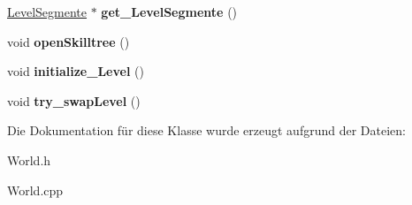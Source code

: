 \begin{DoxyCompactItemize}
\item 
\hypertarget{class_world_affdfa76f27683180d8103b297ae6972c}{\hyperlink{class_level_segmente}{Level\-Segmente} $\ast$ {\bfseries get\-\_\-\-Level\-Segmente} ()}\label{class_world_affdfa76f27683180d8103b297ae6972c}

\item 
\hypertarget{class_world_aae955513a6b43da75bebbaf0022efcc3}{void {\bfseries open\-Skilltree} ()}\label{class_world_aae955513a6b43da75bebbaf0022efcc3}

\item 
\hypertarget{class_world_a862716ca9282cf7f64522fd819427498}{void {\bfseries initialize\-\_\-\-Level} ()}\label{class_world_a862716ca9282cf7f64522fd819427498}

\item 
\hypertarget{class_world_a227f2998664ae3586190752920ee2713}{void {\bfseries try\-\_\-swap\-Level} ()}\label{class_world_a227f2998664ae3586190752920ee2713}

\end{DoxyCompactItemize}


Die Dokumentation für diese Klasse wurde erzeugt aufgrund der Dateien\-:\begin{DoxyCompactItemize}
\item 
World.\-h\item 
World.\-cpp\end{DoxyCompactItemize}
